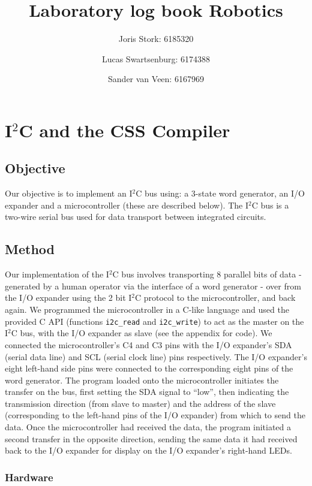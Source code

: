 \documentclass[a4paper, 12pt, titlepage]{article}
\author{Joris Stork: 6185320 \and Lucas Swartsenburg: 6174388 \and Sander van
Veen: 6167969}
\title{Laboratory log book Robotics}
\begin{document}
\maketitle

\section{I$^2$C and the CSS Compiler} %

\subsection{Objective} %

Our objective is to implement an I$^2$C bus using: a 3-state word generator, an
I/O expander and a microcontroller (these are described below). 
The I$^2$C bus is a two-wire serial bus used for data transport between
integrated circuits.


\subsection{Method} %
Our implementation of the I$^2$C bus involves transporting 8 parallel bits of data -
generated by a human operator via the interface of a word generator -
over from the I/O expander using the 2 bit I$^2$C protocol to the microcontroller, and
back again. We programmed the
microcontroller in a C-like language and used the provided C API (functions
\texttt{i2c\_read} and \texttt{i2c\_write}) to act as the master on the I$^2$C
bus, with the I/O expander as slave (see the appendix for code). 
We connected the microcontroller's C4 and C3 pins with the I/O expander's
SDA (serial data line) and SCL (serial clock line) pins respectively. The I/O
expander's eight left-hand side pins were connected to the corresponding eight
pins of the word generator.
The program loaded onto the microcontroller initiates the transfer on the bus,
first setting the SDA signal to ``low'', then  
indicating the transmission direction (from slave to master) and the address of
the slave (corresponding to the left-hand pins of the I/O expander) from which
to send the data. Once the microcontroller had received the data, the program
initiated a second transfer in the opposite direction, sending the same data it
had received back to the I/O expander for display on the I/O expander's
right-hand LEDs.


\subsubsection{Hardware}
\end{document}
